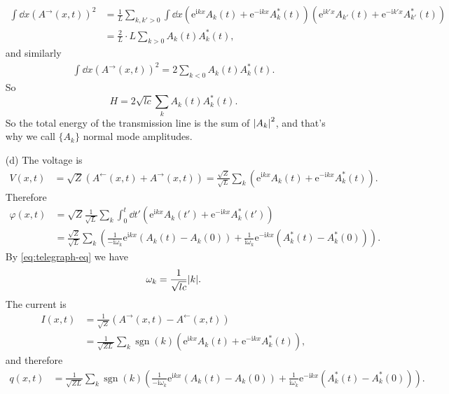 \documentclass[hyperref, a4paper]{article}
\DeclareMathOperator{\sgn}{sgn}
\newcommand*{\ii}{\mathrm{i}}
\newcommand*{\ee}{\mathrm{e}}
\begin{document}
\begin{itemize}
\[\begin{aligned}
        \int \dd{x} (A^{\rightarrow}(x, t))^2 
        &= \frac{1}{L} \sum_{k, k' > 0} \int \dd{x}
        (\ee^{\ii k x} A_k(t) + \ee^{- \ii k x} A_k^*(t))
        (\ee^{\ii k' x} A_{k'}(t) + \ee^{- \ii k' x} A_{k'}^*(t)) \\
        &= \frac{2}{L} \cdot L \sum_{k > 0} A_k(t) A_k^*(t),
    \end{aligned}
\]
and similarly 
\[
    \begin{aligned}
        \int \dd{x} (A^{\rightarrow}(x, t))^2 = 
        2 \sum_{k < 0} A_k(t) A_k^*(t).
    \end{aligned}
\]
So 
\begin{equation}
    H = 2 \sqrt{lc} \sum_k A_k(t) A_k^*(t). 
    \label{eq:circuit-ham}
\end{equation}
So the total energy of the transmission line 
is the sum of $\abs{A_k}^2$,
and that's why we call $\{A_k\}$ normal mode amplitudes.

\item[(d)] The voltage is 
\begin{equation}
    \begin{aligned}
        V(x, t) &= \sqrt{Z} (A^{\leftarrow}(x, t) + A^{\rightarrow}(x, t))
        = \frac{\sqrt{Z}}{\sqrt{L}} \sum_{k } (\ee^{\ii k x} A_k(t) + \ee^{- \ii k x} A_k^*(t)) .
    \end{aligned}
\end{equation}
Therefore
\begin{equation}
    \begin{aligned}
        \varphi(x, t) 
        &= \sqrt{Z} \frac{1}{\sqrt{L}} \sum_{k} \int_0^t \dd{t'} (\ee^{\ii k x} A_k(t') + \ee^{- \ii k x} A_k^*(t')) \\
        &= \frac{\sqrt{Z}}{\sqrt{L}} \sum_k \left(
            \frac{1}{- \ii \omega_k} \ee^{\ii k x} (A_k(t) - A_k(0))
            + \frac{1}{\ii \omega_k} \ee^{- \ii k x} (A_k^*(t) - A_k^*(0))
        \right).
    \end{aligned}
\end{equation}
By \eqref{eq:telegraph-eq} we have 
\begin{equation}
    \omega_k = \frac{1}{\sqrt{lc}} \abs{k}.
\end{equation}
The current is 
\begin{equation}
    \begin{aligned}
        I(x, t) &= \frac{1}{\sqrt{Z}} (A^{\rightarrow}(x, t) - A^{\leftarrow}(x, t)) \\
        &= \frac{1}{\sqrt{ZL}} \sum_{k} \sgn(k) (\ee^{\ii k x} A_k(t) + \ee^{- \ii k x} A_k^*(t)),
    \end{aligned}
\end{equation}
and therefore 
\begin{equation}
    \begin{aligned}
        q(x, t) &= \frac{1}{\sqrt{ZL}} \sum_{k} \sgn(k) \left(
            \frac{1}{- \ii \omega_k} \ee^{\ii k x} (A_k(t) - A_k(0)) 
            + \frac{1}{\ii \omega_k} \ee^{- \ii k x} (A_k^*(t) - A_k^*(0))
        \right).  
    \end{aligned}
\end{equation}


\end{itemize}
\end{document}

